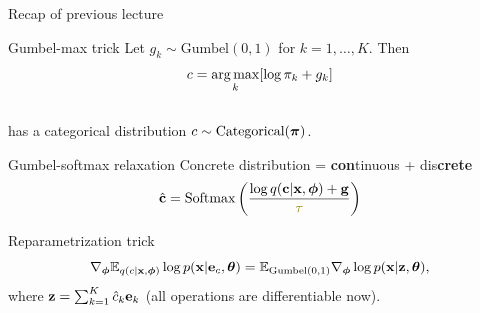 \begin{frame}{Recap of previous lecture}
	\vspace{-0.4cm}
	\begin{block}{Gumbel-max trick}
		Let $g_k \sim \text{Gumbel}(0, 1)$ for $k = 1, \dots, K$. Then
		\vspace{-0.3cm}
		\[
			c = \operatorname*{arg\,max}_k [\log \pi_k + g_k]
		\]
		\vspace{-0.6cm} \\
		has a categorical distribution $c \sim \text{Categorical}(\boldsymbol{\pi})$.
	\end{block}
	\vspace{-0.2cm}
	\begin{block}{Gumbel-softmax relaxation}
		{\color{violet}Con}{\color{teal}crete} distribution = {\color{violet}\textbf{con}tinuous} + {\color{teal}dis\textbf{crete}}
		\[
			\hat{\bc} = \text{Softmax}\left(\frac{\log q(\bc | \bx, \bphi) + \bg}{\color{olive}\tau}\right)
		\]
		\vspace{-0.7cm}
 	\end{block}
	\begin{block}{Reparametrization trick}
		\vspace{-0.4cm}
		\[
			\nabla_{\boldsymbol{\phi}} \mathbb{E}_{q(c | \mathbf{x}, \boldsymbol{\phi})} \log p(\mathbf{x} | \mathbf{e}_{c} , \boldsymbol{\theta}) = \mathbb{E}_{\text{Gumbel}(0, 1)} \nabla_{\boldsymbol{\phi}} \log p(\mathbf{x} | \mathbf{z} , \boldsymbol{\theta}),
		\]
		where $\mathbf{z} = \sum_{k=1}^K\hat{c}_k \mathbf{e}_k$ (all operations are differentiable now).
	\end{block}
 	\vspace{-0.2cm}
\end{frame}
